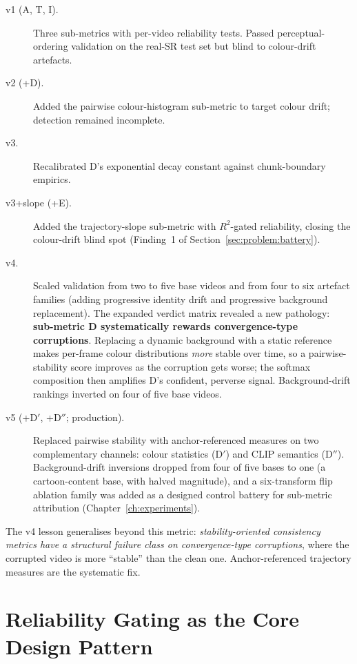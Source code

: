 \begin{description}
    \item[v1 (A, T, I).] Three sub-metrics with per-video reliability tests. Passed
        perceptual-ordering validation on the real-SR test set but blind to colour-drift
        artefacts.
    \item[v2 (+D).] Added the pairwise colour-histogram sub-metric to target colour
        drift; detection remained incomplete.
    \item[v3.] Recalibrated D's exponential decay constant against chunk-boundary
        empirics.
    \item[v3+slope (+E).] Added the trajectory-slope sub-metric with $R^2$-gated
        reliability, closing the colour-drift blind spot (Finding~1 of
        Section~\ref{sec:problem:battery}).
    \item[v4.] Scaled validation from two to five base videos and from four to six
        artefact families (adding progressive identity drift and progressive background
        replacement). The expanded verdict matrix revealed a new pathology:
        \textbf{sub-metric D systematically rewards convergence-type corruptions}.
        Replacing a dynamic background with a static reference makes per-frame colour
        distributions \emph{more} stable over time, so a pairwise-stability score
        improves as the corruption gets worse; the softmax composition then amplifies
        D's confident, perverse signal. Background-drift rankings inverted on four of
        five base videos.
    \item[v5 (+D$'$, +D$''$; production).] Replaced pairwise stability with
        anchor-referenced measures on two complementary channels: colour statistics
        (D$'$) and CLIP semantics (D$''$). Background-drift inversions dropped from four
        of five bases to one (a cartoon-content base, with halved magnitude), and a
        six-transform flip ablation family was added as a designed control battery for
        sub-metric attribution (Chapter~\ref{ch:experiments}).
\end{description}

The v4 lesson generalises beyond this metric: \emph{stability-oriented consistency
metrics have a structural failure class on convergence-type corruptions}, where the
corrupted video is more ``stable'' than the clean one. Anchor-referenced trajectory
measures are the systematic fix.

\section{Reliability Gating as the Core Design Pattern}
\label{sec:method:reliability}

